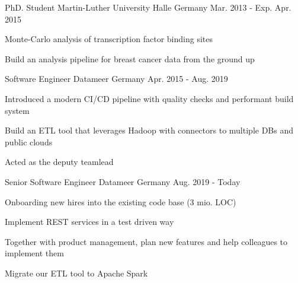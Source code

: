 


\begin{cventries}


\cventry
{PhD. Student} %
{Martin-Luther University Halle} %
{Germany} %
{Mar. 2013 - Exp. Apr. 2015} %
{ %
\begin{cvitems}
\item {Monte-Carlo analysis of transcription factor binding sites}
\item {Build an analysis pipeline for breast cancer data from the ground up}
\end{cvitems}
}

\cventry
{Software Engineer} %
{Datameer} %
{Germany} %
{Apr. 2015 - Aug. 2019} %
{ %
\begin{cvitems}
\item {Introduced a modern CI/CD pipeline with quality checks and performant build system}
\item {Build an ETL tool that leverages Hadoop with connectors to multiple DBs and public clouds}
\item {Acted as the deputy teamlead}
\end{cvitems}
}


\cventry
{Senior Software Engineer} %
{Datameer} %
{Germany} %
{Aug. 2019 - Today} %
{ %
\begin{cvitems}
\item {Onboarding new hires into the existing code base (3 mio. LOC)}
\item {Implement REST services in a test driven way}
\item {Together with product management, plan new features and help colleagues to implement them}
\item {Migrate our ETL tool to Apache Spark}
\end{cvitems}
}

\end{cventries}
